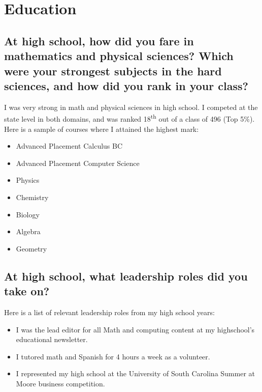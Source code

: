 \documentclass{article}
\begin{document}
\section{Education}
\subsection{At high school, how did you fare in mathematics
  and physical sciences? Which were your strongest subjects in the hard sciences,
  and how did you rank in your class?}

I was very strong in math and physical sciences in high school. I competed at the state level
in both domains, and was ranked 18\textsuperscript{th} out of a class of 496 (Top 5\%). Here is
a sample of courses where I attained the highest mark:
\begin{multicols}{2}
  \begin{itemize}
    \item Advanced Placement Calculus BC
    \item Advanced Placement Computer Science
    \item Physics
    \item Chemistry
    \item Biology
    \item Algebra
    \item Geometry
  \end{itemize}
\end{multicols}

\subsection{At high school, what leadership roles did you take on?}

Here is a list of relevant leadership roles from my high school years:
\begin{itemize}
  \item I was the lead editor for all Math and computing content at my highschool's educational newsletter.
  \item I tutored math and Spanish for 4 hours a week as a volunteer.
  \item I represented my high school at the University of South Carolina Summer at Moore business competition.
\end{itemize}
\end{document}
